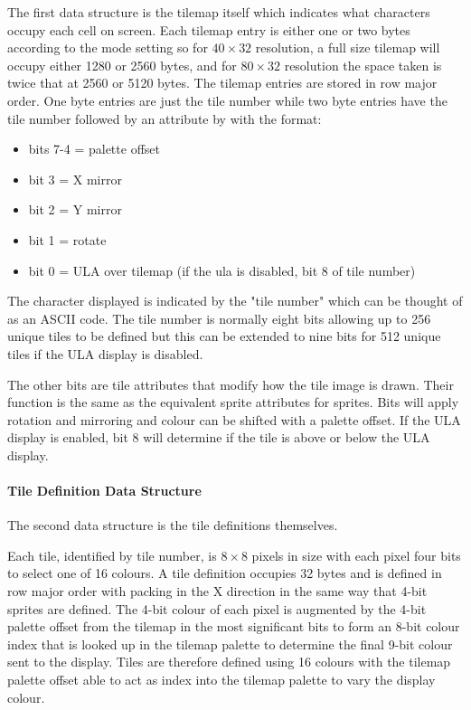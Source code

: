 The first data structure is the tilemap itself which indicates what
characters occupy each cell on screen.  Each tilemap entry is either
one or two bytes according to the mode setting so for $40\times32$
resolution, a full size tilemap will occupy either 1280 or 2560 bytes,
and for $80\times32$ resolution the space taken is twice that at 2560
or 5120 bytes.  The tilemap entries are stored in row major order. One
byte entries are just the tile number while two byte entries have the
tile number followed by an attribute by with the format:

\begin{itemize}
\item bits 7-4 = palette offset
\item bit 3 = X mirror
\item bit 2 = Y mirror
\item bit 1 = rotate
\item bit 0 = ULA over tilemap (if the ula is disabled, bit 8 of tile number)
\end{itemize}

The character displayed is indicated by the "tile number" which can be
thought of as an ASCII code.  The tile number is normally eight bits
allowing up to 256 unique tiles to be defined but this can be extended
to nine bits for 512 unique tiles if the ULA display is disabled.

The other bits are tile attributes that modify how the tile image is
drawn.  Their function is the same as the equivalent sprite attributes
for sprites.  Bits will apply rotation and mirroring and colour can be
shifted with a palette offset.  If the ULA display is enabled, bit 8
will determine if the tile is above or below the ULA display.

\paragraph{Tile Definition Data Structure}

The second data structure is the tile definitions themselves.

Each tile, identified by tile number, is $8\times8$ pixels in size
with each pixel four bits to select one of 16 colours.  A tile
definition occupies 32 bytes and is defined in row major order with
packing in the X direction in the same way that 4-bit sprites are
defined.  The 4-bit colour of each pixel is augmented by the 4-bit
palette offset from the tilemap in the most significant bits to form
an 8-bit colour index that is looked up in the tilemap palette to
determine the final 9-bit colour sent to the display.  Tiles are
therefore defined using 16 colours with the tilemap palette offset
able to act as index into the tilemap palette to vary the display
colour.

